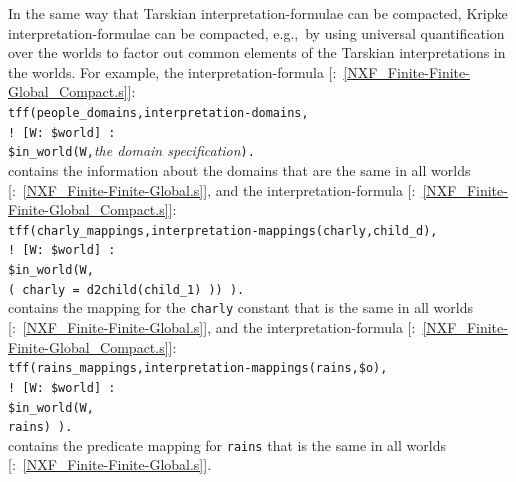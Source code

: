 \documentclass{easychair}
\newcommand{\smalltt}[1]{\small \texttt{#1}}
\newcommand{\example}{{\scriptsize \faFile[regular]}}
\begin{document}
In the same way that Tarskian interpretation-formulae can be compacted, Kripke
interpretation-formulae can be compacted, e.g.,~by using universal quantification over the
worlds to factor out common elements of the Tarskian interpretations in the worlds.
For example, the interpretation-formula [\example{}:~\ref{NXF_Finite-Finite-Global_Compact.s}]: \\
\hspace*{0.5cm}\smalltt{tff(people\_domains,interpretation-domains,} \\
\hspace*{0.9cm}\smalltt{! [W: \$world] :} \\
\hspace*{1.3cm}\smalltt{\$in\_world(W,}\emph{the domain specification}\smalltt{).} \\
contains the information about the domains that are the same in all worlds 
[\example{}:~\ref{NXF_Finite-Finite-Global.s}], and the interpretation-formula
[\example{}:~\ref{NXF_Finite-Finite-Global_Compact.s}]: \\
\hspace*{0.5cm}\smalltt{tff(charly\_mappings,interpretation-mappings(charly,child\_d),}\\
\hspace*{0.9cm}\smalltt{! [W: \$world] :} \\
\hspace*{1.3cm}\smalltt{\$in\_world(W,} \\
\hspace*{1.7cm}\smalltt{( charly = d2child(child\_1) )) ).} \\
contains the mapping for the \smalltt{charly} constant that is the same in all worlds
[\example{}:~\ref{NXF_Finite-Finite-Global.s}], and the interpretation-formula
[\example{}:~\ref{NXF_Finite-Finite-Global_Compact.s}]: \\
\hspace*{0.5cm}\smalltt{tff(rains\_mappings,interpretation-mappings(rains,\$o),} \\
\hspace*{0.5cm}\smalltt{! [W: \$world] :} \\
\hspace*{0.9cm}\smalltt{\$in\_world(W,} \\
\hspace*{1.3cm}\smalltt{rains) ).} \\
contains the predicate mapping for \smalltt{rains} that is the same in all worlds
[\example{}:~\ref{NXF_Finite-Finite-Global.s}].
\end{document}
